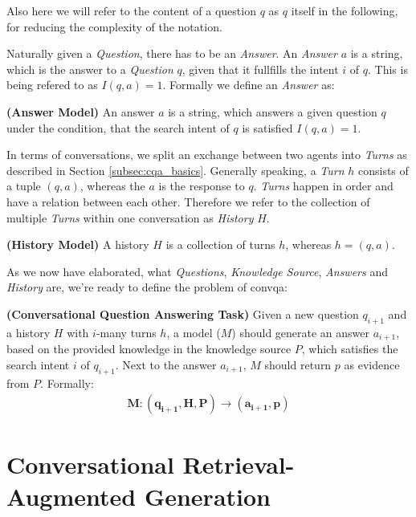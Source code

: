 Also here we will refer to the content of a question $q$ as $q$ itself in the following, for reducing the complexity of the notation.

Naturally given a \textit{Question}, there has to be an \textit{Answer}. An \textit{Answer} $a$ is a string, which is the answer to a \textit{Question} $q$, given that it fullfills the intent $i$ of $q$. This is being refered to as $I(q,a) = 1$. Formally we define an \textit{Answer} as:

\begin{definition}
    \textbf{(Answer Model)} An answer $a$ is a string, which answers a given question $q$ under the condition, that the search intent of $q$ is satisfied $I(q,a) = 1$.
    \label{def:answer_model}
\end{definition}

In terms of conversations, we split an exchange between two agents into \textit{Turns} as described in Section \ref{subsec:cqa_basics}. Generally speaking, a \textit{Turn} $h$ consists of a tuple $(q,a)$, whereas the $a$ is the response to $q$. \textit{Turns} happen in order and have a relation between each other. Therefore we refer to the collection of multiple \textit{Turns} within one conversation as \textit{History} $H$.

\begin{definition}
    \textbf{(History Model)} A history $H$ is a collection of turns $h$, whereas $h = (q,a)$.
    \label{def:history_model}
\end{definition}

As we now have elaborated, what \textit{Questions}, \textit{Knowledge Source}, \textit{Answers} and \textit{History} are, we're ready to define the problem of \gls{convqa}:

\begin{definition}
    \textbf{(Conversational Question Answering Task)} Given a new question $q_{i+1}$ and a history $H$ with $i$-many turns $h$, a model ($M$) should generate an answer $a_{i+1}$, based on the provided knowledge in the knowledge source $P$, which satisfies the search intent $i$ of $q_{i+1}$. Next to the answer $a_{i+1}$, $M$ should return $p$ as evidence from $P$. Formally:
    \begin{align*}
        \mathbf{M: (q_{i+1}, H, P) \rightarrow (a_{i+1}, p)}
    \end{align*}
    \label{def:task}
\end{definition}

\section{Conversational Retrieval-Augmented Generation}
\label{sec:conrag}

